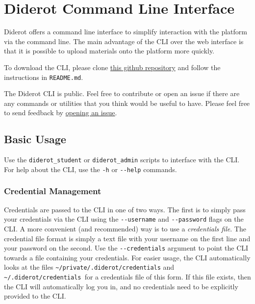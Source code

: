 \chapter{Diderot Command Line Interface}

Diderot offers a command line interface to simplify interaction with
the platform via the command line.
%
The main advantage of the CLI over the web interface is that it is possible to upload materials onto the platform more quickly.

\begin{important}


To download the CLI, please clone 
%
\href{https://github.com/diderot-edu/diderot-cli}{this github repository}
%
and follow the instructions in \lstinline`README.md`. 

The Diderot CLI is public. Feel free to contribute or open an issue if there
are any commands or utilities that you think would be useful to have.
%
Please feel free to send feedback by 
\href{https://github.com/diderot-edu/diderot-cli/issues}{opening an issue}.
\end{important}


\section{Basic Usage}

Use the \verb|diderot_student| or \verb|diderot_admin| scripts to interface with the CLI.
%
For help about the CLI, use the \verb|-h| or \verb|--help| commands.

\subsection{Credential Management}
Credentials are passed to the CLI in one of two ways. 
%
The first is to simply pass your credentials via the CLI using the \verb|--username| and \verb|--password| flags on the CLI. 
%
A more convenient (and recommended) way is to use a \emph{credentials file}.
%
The credential file format is simply a text file with your username on the first line and your password on the second. 
%
Use the \verb|--credentials| argument to point the CLI towards a file containing your credentials.
%
For easier usage, the CLI automatically looks at the files \verb|~/private/.diderot/credentials| and \verb|~/.diderot/credentials |for a credentials file of this form. 
%
If this file exists, then the CLI will automatically log you in, and no credentials need to be explicitly provided to the CLI.
%


